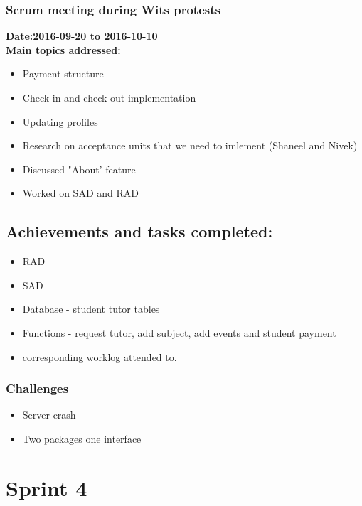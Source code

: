 \documentclass[12pt]{article}
\begin{document}
{\subsubsection{Scrum meeting during Wits protests}
\textbf{Date:2016-09-20 to 2016-10-10}\\
\textbf{Main topics addressed:}
\begin{itemize}
\item Payment structure
\item Check-in and check-out implementation
\item Updating profiles
\item  Research on acceptance units that we need to imlement (Shaneel and Nivek)
\item Discussed "About' feature
\item Worked on SAD and RAD
\end{itemize}

\subsection{Achievements and tasks completed:}
\begin{itemize}
\item RAD 
\item SAD 
\item Database - student tutor tables
\item Functions - request tutor, add subject, add events and student payment
\item corresponding worklog attended to.
\end{itemize}


\subsubsection{Challenges}
\begin{itemize}
\item Server crash
\item Two packages one interface
\end{itemize}

\section{Sprint 4}
}
\end{document}
